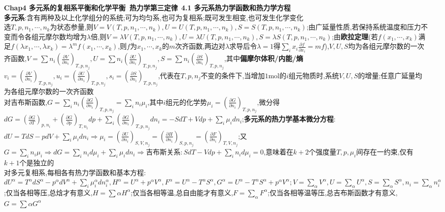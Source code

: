 \documentclass[10pt,a4paper]{article}
\begin{document}
\begin{multicols}{2}
\noindent\textbf{Chap4 多元系的复相系平衡和化学平衡~热力学第三定律}~\textbf{4.1 多元系热力学函数和热力学方程}\\
\textbf{多元系}:含有两种及以上化学组分的系统;可为均匀系,也可为复相系;既可发生相变,也可发生化学变化\\
选$T,p,n_1,\cdots,n_k$为状态参量,则$V=V(T,p,n_1,\cdots,n_k),U=U(T,p,n_1,\cdots,n_k),S=S(T,p,n_1,\cdots,n_k)$;由广延量性质,若保持系统温度和压力不变而令各组元摩尔数均增为$\lambda$倍,则$V=\lambda V(T,p,n_1,\cdots,n_k),U=\lambda U(T,p,n_1,\cdots,n_k),S=\lambda S(T,p,n_1,\cdots,n_k)$;由\textbf{欧拉定理}(若$f(x_1,\cdots,x_k)$满足$f(\lambda x_1,\cdots,\lambda x_k)=\lambda^mf(x_1,\cdots,x_k)$,则$f$为$x_1,\cdots,x_k$的$m$次齐函数,两边对$\lambda$求导后令$\lambda=1$得$\sum_ix_i\frac{\partial f}{\partial x_i}=mf$),$V,U,S$均为各组元摩尔数的一次齐函数,$V=\sum n_i\left(\frac{\partial V}{\partial n_i}\right)_{T,p,n_j},U=\sum n_i\left(\frac{\partial U}{\partial n_i}\right)_{T,p,n_j},S=\sum n_i\left(\frac{\partial S}{\partial n_i}\right)_{T,p,n_j}$,其中\textbf{偏摩尔体积/内能/熵}$v_i=\left(\frac{\partial V}{\partial n_i}\right)_{T,p,n_j},u_i=\left(\frac{\partial U}{\partial n_i}\right)_{T,p,n_j},s_i=\left(\frac{\partial S}{\partial n_i}\right)_{T,p,n_j}$,代表在$T,p,n_j$不变的条件下,当增加$1$mol的$i$组元物质时,系统$V,U,S$的增量;任意广延量均为各组元摩尔数的一次齐函数\\
对吉布斯函数,$G=\sum_in_i\left(\frac{\partial G}{\partial n_i}\right)_{T,p,n_j}=\sum_in_i\mu_i$,其中$i$组元的化学势$\mu_i=\left(\frac{\partial G}{\partial n_i}\right)_{T,p,n_j}$,微分得$dG=\left(\frac{\partial G}{\partial T}\right)_{p,n_i}+\left(\frac{\partial G}{\partial p}\right)_{T,n_i}dp+\sum_i\left(\frac{\partial G}{\partial n_i}\right)_{T,p,n_j}dn_i=-SdT+Vdp+\sum_i\mu_idn_i$;\textbf{多元系的热力学基本微分方程}:$dU=TdS-pdV+\sum_i\mu_idn_i\Rightarrow\mu_i=\left(\frac{\partial U}{\partial n_i}\right)_{S,V,n_j}=\left(\frac{\partial H}{\partial n_i}\right)_{S,p,n_j}=\left(\frac{\partial F}{\partial n_i}\right)_{T,V,n_j}$;又$G=\sum_in_i\mu_i\Rightarrow dG=\sum_in_id\mu_i+\sum_i\mu_idn_i\Rightarrow\textbf{吉布斯关系}:SdT-Vdp+\sum_in_id\mu_i=0$,意味着在$k+2$个强度量$T,p,\mu_i$间存在一约束,仅有$k+1$个是独立的\\
对多元复相系,每相各有热力学函数和基本方程:$dU^{\alpha}=T^{\alpha}dS^{\alpha}-p^{\alpha}dV^{\alpha}+\sum_i\mu_i^{\alpha}dn_i^{\alpha},H^{\alpha}=U^{\alpha}+p^{\alpha}V^{\alpha},F^{\alpha}=U^{\alpha}-T^{\alpha}S^{\alpha},G^{\alpha}=U^{\alpha}-T^{\alpha}S^{\alpha}+p^{\alpha}V^{\alpha};V=\sum_{\alpha}V^{\alpha},U=\sum_{\alpha}U^{\alpha},S=\sum_{\alpha}S^{\alpha},n_i=\sum_{\alpha}n_i^{\alpha}$;仅当各相等压,总焓才有意义,$H=\sum{\alpha}H^{\alpha}$;仅当各相等温,总自由能才有意义,$F=\sum_{\alpha}F^{\alpha}$;仅当各相等温等压,总吉布斯函数才有意义,$G=\sum{\alpha}G^{\alpha}$\\

\end{multicols}
\end{document}
